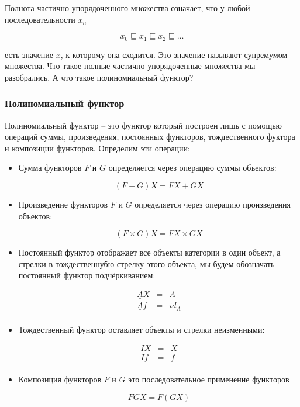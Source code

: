 Полнота частично упорядоченного множества означает,
что у любой последовательности $x_n$ 

\[ x_0 \sqsubseteq x_1 \sqsubseteq x_2 \sqsubseteq \dots \]

\noindent есть значение $x$, к которому она сходится.
Это значение называют супремумом множества.
Что такое полные частично упорядоченные множества 
мы разобрались. А что такое полиномиальный функтор? 

\subsubsection{Полиномиальный функтор}

Полиномиальный функтор -- это функтор который построен лишь
с помощью операций суммы, произведения, постоянных функторов,
тождественного фуктора и композиции функторов.
Определим эти операции:

\begin{itemize}
\item Сумма функторов $F$ и $G$ определяется через операцию
    суммы объектов:

   \[ (F+G)X = FX + GX \]
        
\item Произведение функторов $F$ и $G$ определяется через операцию 
    произведения объектов:

    \[ (F\times G)X = FX \times GX \]

\item Постоянный функтор отображает все объекты категории 
    в один объект, а стрелки в тождественнубю стрелку этого
    объекта, мы будем обозначать постоянный функтор подчёркиванием:

\begin{eqnarray*}
    \underline{A}X &=& A \\
    \underline{A}f &=& id_A \\
\end{eqnarray*}

\item Тождественный функтор оставляет объекты и стрелки
    неизменными:

\begin{eqnarray*}
    IX &=& X \\
    If &=& f \\
\end{eqnarray*}
  
\item Композиция функторов $F$ и $G$ это последовательное применение 
     функторов

\[ FGX = F(GX) \]
\end{itemize}

